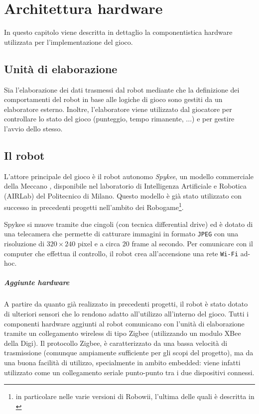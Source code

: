 \chapter{Architettura hardware}
\label{cap:architettura}

In questo capitolo viene descritta in dettaglio la componentistica hardware utilizzata per l'implementazione del gioco.

\section{Unità di elaborazione}
Sia l'elaborazione dei dati trasmessi dal robot mediante che la definizione dei comportamenti del robot in base alle logiche di gioco sono gestiti da un elaboratore esterno. Inoltre, l'elaboratore viene utilizzato dal giocatore per controllare lo stato del gioco (punteggio, tempo rimanente, ...) e per gestire l'avvio dello stesso.

\section{Il robot}


L'attore principale del gioco è il robot autonomo \emph{Spykee}, un modello commerciale della Meccano \cite{spykeeweb}, disponibile nel laboratorio di Intelligenza Artificiale e Robotica (AIRLab) del Politecnico di Milano. Questo modello è già stato utilizzato con successo in precedenti progetti nell'ambito dei Robogame\footnote{in particolare nelle varie versioni di Robowii, l'ultima delle quali è descritta in \cite{robowii}}.

Spykee si muove tramite due cingoli (con tecnica differential drive) ed è dotato di una telecamera che permette di catturare immagini in formato \verb|JPEG| con una risoluzione di $320 \times 240$ pixel e a circa $20$ frame al secondo. Per comunicare con il computer che effettua il controllo, il robot crea all'accensione una rete \verb|Wi-Fi| ad-hoc.

\paragraph{Aggiunte hardware} A partire da quanto già realizzato in precedenti progetti, il robot è stato dotato di ulteriori sensori che lo rendono adatto all'utilizzo all'interno del gioco. Tutti i componenti hardware aggiunti al robot comunicano con l'unità di elaborazione tramite un collegamento wireless di tipo Zigbee (utilizzando un modulo XBee della Digi). Il protocollo Zigbee, è caratterizzato da una bassa velocità di trasmissione (comunque ampiamente sufficiente per gli scopi del progetto), ma da una buona facilità di utilizzo, specialmente in ambito embedded: viene infatti utilizzato come un collegamento seriale punto-punto tra i due dispositivi connessi.

